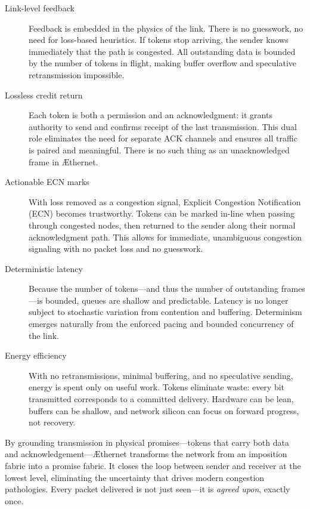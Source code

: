 \documentclass[../../../OAE-SPEC-MAIN.tex]{subfiles}
\begin{document}
\begin{description}

  \item[Link-level feedback]  
  Feedback is embedded in the physics of the link. There is no guesswork, no need for loss-based heuristics. If tokens stop arriving, the sender knows immediately that the path is congested. All outstanding data is bounded by the number of tokens in flight, making buffer overflow and speculative retransmission impossible.

  \item[Lossless credit return]  
  Each token is both a permission and an acknowledgment: it grants authority to send and confirms receipt of the last transmission. This dual role eliminates the need for separate ACK channels and ensures all traffic is paired and meaningful. There is no such thing as an unacknowledged frame in \AE thernet.

  \item[Actionable ECN marks]  
  With loss removed as a congestion signal, Explicit Congestion Notification (ECN) becomes trustworthy. Tokens can be marked in-line when passing through congested nodes, then returned to the sender along their normal acknowledgment path. This allows for immediate, unambiguous congestion signaling with no packet loss and no guesswork.

  \item[Deterministic latency]  
  Because the number of tokens—and thus the number of outstanding frames—is bounded, queues are shallow and predictable. Latency is no longer subject to stochastic variation from contention and buffering. Determinism emerges naturally from the enforced pacing and bounded concurrency of the link.

  \item[Energy efficiency]  
  With no retransmissions, minimal buffering, and no speculative sending, energy is spent only on useful work. Tokens eliminate waste: every bit transmitted corresponds to a committed delivery. Hardware can be lean, buffers can be shallow, and network silicon can focus on forward progress, not recovery.

\end{description}

By grounding transmission in physical promises—tokens that carry both data and acknowledgement—\AE thernet transforms the network from an imposition fabric into a promise fabric. It closes the loop between sender and receiver at the lowest level, eliminating the uncertainty that drives modern congestion pathologies. Every packet delivered is not just seen—it is \emph{agreed upon}, exactly once.
\end{document}
